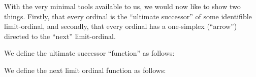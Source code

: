 \documentclass[a4paper,openany]{amsbook}
\begin{document}
\begin{deAxiom}
\hypothesis{\Gamma}{\judgement{\alpha}{\Ordinal}}
\conclusion{\Gamma}{
  \judgement{\arrow{\limitOrd{\alpha}}{\limitOrd{\successor{\alpha}}}}{\Ordinal}
}
\end{deAxiom}

\begin{deAxiom}
\hypothesis{\Gamma}{\judgement{\alpha}{\Ordinal}}
\hypothesis{\Gamma}{\judgement{\beta}{\Ordinal}}
\hypothesis{\Gamma}{\judgement{\arrow{\alpha}{\limitOrd{\beta}}}{\Ordinal}}
\conclusion{\Gamma}{
  \judgement{\arrow{\successor{\alpha}}{\limitOrd{\beta}}}{\Ordinal}
}
\end{deAxiom}


With the very minimal tools available to us, we would now like to show two
things.  Firstly, that every ordinal is the ``ultimate successor'' of some
identifible limit-ordinal, and secondly, that every ordinal has a one-simplex
(``arrow'') directed to the ``next'' limit-ordinal.

We define the ultimate successor ``function'' as follows:

\begin{deAxiom}
\hypothesis{\Gamma}{\judgement{\alpha}{\Ordinal}}
\end{deAxiom}

\begin{deAxiom}
\hypothesis{\Gamma}{\judgement{\alpha}{\Ordinal}}
\hypothesis{\Gamma}{\judgement{\beta}{\Ordinal}}
\hypothesis{\Gamma}{\judgement{\arrow{\alpha}{\successor{\alpha}}}{\Ordinal}}
\end{deAxiom}

We define the next limit ordinal function as follows:

\begin{deAxiom}
\hypothesis{\Gamma}{\judgement{\alpha}{\Ordinal}}
\end{deAxiom}
\end{document}
